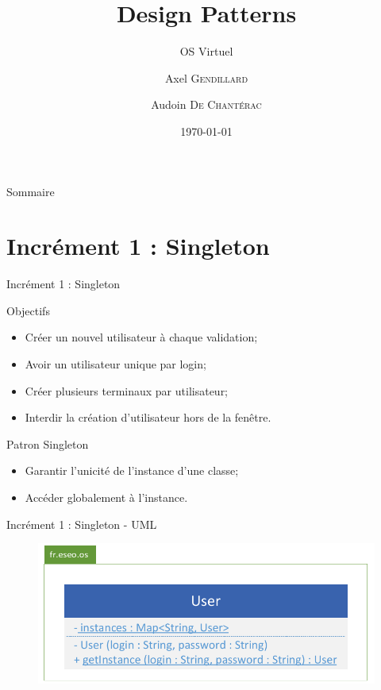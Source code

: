 \documentclass[utf8, 14pt]{beamer}
\title[Design Patterns]{Design Patterns}
\subtitle{OS Virtuel}
\author[Axel G. | Audoin De C.]{Axel \textsc{Gendillard} \and Audoin \textsc{De Chantérac}}
\institute[]
{
	Étudiant ingénieur\\ 
	Groupe ESEO \\
}
\date{\today}
\begin{document}
\begin{frame}
\titlepage
\end{frame}

\begin{frame}{Sommaire}
\tableofcontents
\end{frame} 


\section{Incrément 1 : Singleton}
	
	\begin{frame}{Incrément 1 : Singleton}
		\begin{block}{Objectifs}
		\begin{itemize}
		\item Créer un nouvel utilisateur à chaque validation;
		\item Avoir un utilisateur unique par login;
		\item Créer plusieurs terminaux par utilisateur;
		\item Interdir la création d'utilisateur hors de la fenêtre.
		\end{itemize}
		\end{block}
		
		\begin{exampleblock}{Patron Singleton}
		\begin{itemize}
		\item Garantir l'unicité de l'instance d'une classe;
		\item Accéder globalement à l'instance.
		\end{itemize}
		\end{exampleblock}					
	\end{frame}

	\begin{frame}{Incrément 1 : Singleton - UML}
		\begin{figure}[!h]
		\centering
		\includegraphics[width=\textwidth]{../uml/uml-singleton}
		\end{figure}		
	\end{frame}
\end{document}
